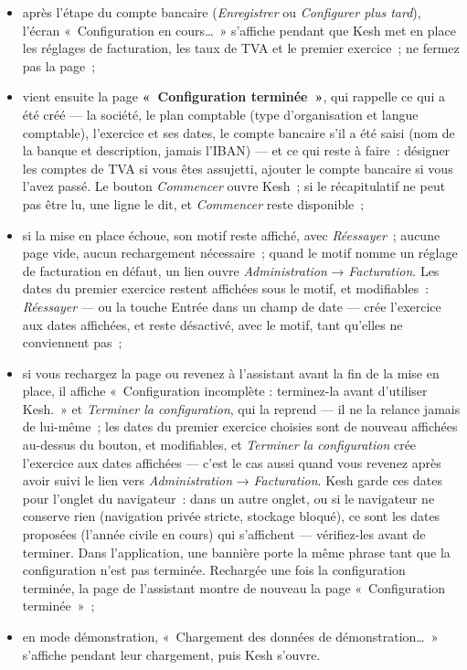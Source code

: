 \documentclass[a4paper,11pt,oneside]{article}
\begin{document}
\begin{itemize}
    \item après l'étape du compte bancaire (\emph{Enregistrer} ou \emph{Configurer plus tard}), l'écran «~Configuration en cours…~» s'affiche pendant que Kesh met en place les réglages de facturation, les taux de TVA et le premier exercice~; ne fermez pas la page~;
    \item vient ensuite la page \textbf{«~Configuration terminée~»}, qui rappelle ce qui a été créé --- la société, le plan comptable (type d'organisation et langue comptable), l'exercice et ses dates, le compte bancaire s'il a été saisi (nom de la banque et description, jamais l'IBAN) --- et ce qui reste à faire~: désigner les comptes de TVA si vous êtes assujetti, ajouter le compte bancaire si vous l'avez passé. Le bouton \emph{Commencer} ouvre Kesh~; si le récapitulatif ne peut pas être lu, une ligne le dit, et \emph{Commencer} reste disponible~;
    \item si la mise en place échoue, son motif reste affiché, avec \emph{Réessayer}~; aucune page vide, aucun rechargement nécessaire~; quand le motif nomme un réglage de facturation en défaut, un lien ouvre \emph{Administration} → \emph{Facturation}. Les dates du premier exercice restent affichées sous le motif, et modifiables~: \emph{Réessayer} --- ou la touche Entrée dans un champ de date --- crée l'exercice aux dates affichées, et reste désactivé, avec le motif, tant qu'elles ne conviennent pas~;
    \item si vous rechargez la page ou revenez à l'assistant avant la fin de la mise en place, il affiche «~Configuration incomplète : terminez-la avant d'utiliser Kesh.~» et \emph{Terminer la configuration}, qui la reprend --- il ne la relance jamais de lui-même~; les dates du premier exercice choisies sont de nouveau affichées au-dessus du bouton, et modifiables, et \emph{Terminer la configuration} crée l'exercice aux dates affichées --- c'est le cas aussi quand vous revenez après avoir suivi le lien vers \emph{Administration} → \emph{Facturation}. Kesh garde ces dates pour l'onglet du navigateur~: dans un autre onglet, ou si le navigateur ne conserve rien (navigation privée stricte, stockage bloqué), ce sont les dates proposées (l'année civile en cours) qui s'affichent --- vérifiez-les avant de terminer. Dans l'application, une bannière porte la même phrase tant que la configuration n'est pas terminée. Rechargée une fois la configuration terminée, la page de l'assistant montre de nouveau la page «~Configuration terminée~»~;
    \item en mode démonstration, «~Chargement des données de démonstration…~» s'affiche pendant leur chargement, puis Kesh s'ouvre.
\end{itemize}
\end{document}
